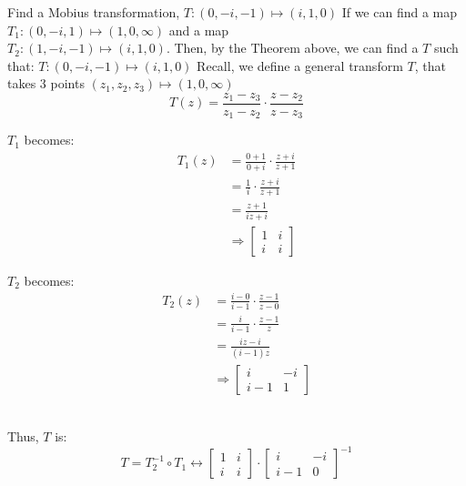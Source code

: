 \documentclass[a4paper, 10pt]{article}
\begin{document}
\begin{examplebox}{Find a Mobius transformation, $T:  (0,-i,-1) \mapsto (i, 1, 0)$}{}
  \footnotesize If we can find a map $T_1 : (0, -i, 1) \mapsto (1, 0, \infty)$ and a map \\
  $T_2 : (1, -i, -1) \mapsto (i, 1, 0)$. Then, by the Theorem above, we can find a $T$ such that: $T:(0, -i, -1) \mapsto (i, 1,0)$
  Recall, we define a general transform $T$, that takes 3 points $(z_1, z_2, z_3) \mapsto (1, 0, \infty)$
  $$T(z) = \frac{z_1 - z_3}{z_1 - z_2} \cdot \frac{z - z_2}{z - z_3} $$
  \noindent
  \scriptsize\begin{minipage}{0.45\textwidth}
    $T_1$ becomes:
    \begin{align*}
      T_1(z) & = \frac{0 +1}{0+i} \cdot \frac{z+i}{z+1}                \\
             & = \frac{1}{i}\cdot \frac{z+i}{z+1}                      \\
             & = \frac{z+1}{iz + i}                                    \\
             & \Rightarrow \begin{bmatrix}1 & i \\ i & i \end{bmatrix}
    \end{align*}
  \end{minipage}
  \begin{minipage}{0.45\textwidth}
    $T_2$ becomes:
    \begin{align*}
      T_2(z) & = \frac{i-0}{i-1} \cdot \frac{z-1}{z-0}                    \\
             & = \frac{i}{i-1} \cdot \frac{z-1}{z}                        \\
             & = \frac{iz - i}{(i-1)z }                                   \\
             & \Rightarrow \begin{bmatrix}i & -i \\ i-1 & 1 \end{bmatrix}
    \end{align*}
  \end{minipage}
  \hfill \\[2ex]
  Thus, $T$ is:
  $$T =T^{-1}_2 \circ T_1 \leftrightarrow \begin{bmatrix}1 & i \\ i & i\end{bmatrix} \cdot \begin{bmatrix} i & -i \\ i-1 & 0 \end{bmatrix}^{-1}$$

\end{examplebox}
\end{document}

